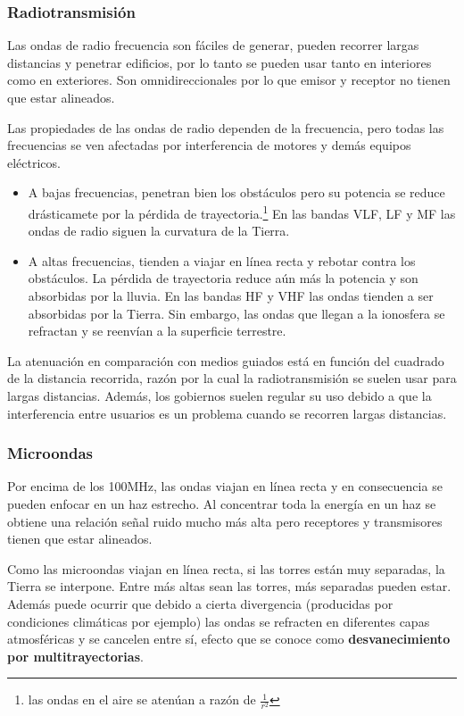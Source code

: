 \documentclass{book}
\begin{document}
	\subsubsection{Radiotransmisión}
	Las ondas de radio frecuencia son fáciles de generar, pueden recorrer largas distancias y penetrar edificios, por lo tanto se pueden usar tanto en interiores como en exteriores. Son omnidireccionales por lo que emisor y receptor no tienen que estar alineados.
	
	\vspace{3mm}
	Las propiedades de las ondas de radio dependen de la frecuencia, pero todas las frecuencias se ven afectadas por interferencia de motores y demás equipos eléctricos.
	
	\begin{itemize}
		\item A bajas frecuencias, penetran bien los obstáculos pero su potencia se reduce drásticamete por la pérdida de trayectoria.\footnote{las ondas en el aire se atenúan a razón de $\frac{1}{r^{2}}$} En las bandas VLF, LF y MF las ondas de radio siguen la curvatura de la Tierra.
		\item A altas frecuencias, tienden a viajar en línea recta y rebotar contra los obstáculos. La pérdida de trayectoria reduce aún más la potencia y son absorbidas por la lluvia. En las bandas HF y VHF las ondas tienden a ser absorbidas por la Tierra. Sin embargo, las ondas que llegan a la ionosfera se refractan y se reenvían a la superficie terrestre.
	\end{itemize}
	
	La atenuación en comparación con medios guiados está en función del cuadrado de la distancia recorrida, razón por la cual la radiotransmisión se suelen usar para largas distancias. Además, los gobiernos suelen regular su uso debido a que la interferencia entre usuarios es un problema cuando se recorren largas distancias.
	
	\subsubsection{Microondas}
	Por encima de los 100MHz, las ondas viajan en línea recta y en consecuencia se pueden enfocar en un haz estrecho. Al concentrar toda la energía en un haz se obtiene una relación señal ruido mucho más alta pero receptores y transmisores tienen que estar alineados.
	
	\vspace{3mm}
	Como las microondas viajan en línea recta, si las torres están muy separadas, la Tierra se interpone. Entre más altas sean las torres, más separadas pueden estar. Además puede ocurrir que debido a cierta divergencia (producidas por condiciones climáticas por ejemplo) las ondas se refracten en diferentes capas atmosféricas y se cancelen entre sí, efecto que se conoce como \textbf{desvanecimiento por multitrayectorias}.
	
\end{document}
